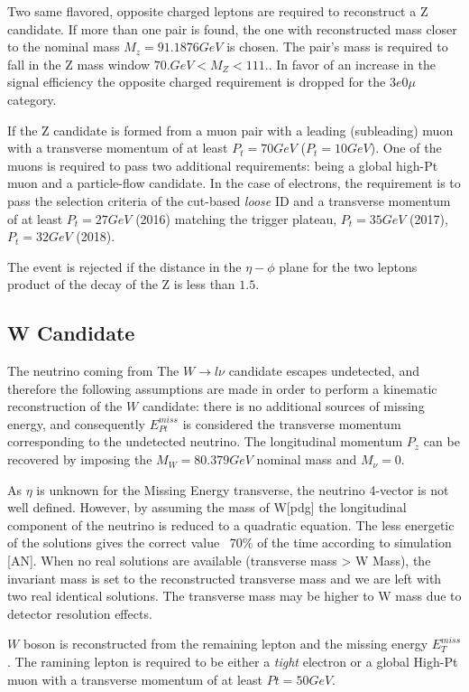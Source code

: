 Two same flavored, opposite charged leptons are required to reconstruct a Z
candidate. If more than one pair is found, the one with reconstructed mass
closer to the nominal mass $M_z= 91.1876 GeV$ is chosen. The pair's mass
is required to fall in the Z mass window $ 70. GeV < M_Z < 111.$. In favor of an
increase in the signal efficiency the opposite charged requirement is dropped
for the $3e0\mu$ category.

If the Z candidate is formed from a muon pair with a leading (subleading) muon with
a transverse momentum of at least $P_t=70 GeV$ ($P_t=10GeV$). One of the
muons is required to pass two additional requirements: being a global high-Pt muon and a
particle-flow candidate. In the case of electrons, the requirement is to pass the
selection criteria of the cut-based \emph{loose} ID and a transverse momentum of
at least $P_t=27GeV$ (2016) matching the trigger plateau, $P_t=35GeV$ (2017),
$P_t=32GeV$ (2018).

The event is rejected if the distance in the $\eta-\phi$ plane for the two
leptons product of the decay of the Z is less than $1.5$.

\subsection{W Candidate}

The neutrino coming from The $W \rightarrow l\nu$ candidate escapes undetected,
and therefore the following assumptions are made in order to perform a kinematic
reconstruction of the $W$ candidate: there is no additional sources of missing
energy, and consequently $E_{Pt}^{miss}$ is considered the transverse momentum
corresponding to the undetected neutrino. The longitudinal momentum $P_z$ can be
recovered by imposing the $M_W = 80.379 GeV $ nominal mass and $M_\nu = 0.$

As $\eta$ is unknown for the Missing Energy transverse, the neutrino 4-vector is
not well defined. However, by assuming the mass of W[pdg] the longitudinal component
of the neutrino is reduced to a quadratic equation. The less energetic of the
solutions gives the correct value ~70\% of the time according to simulation [AN].
When no real solutions are available (transverse mass > W Mass), the invariant
mass is set to the reconstructed transverse mass and we are left with two real
identical solutions. The transverse mass may be higher to W mass due to detector
resolution effects.

$W$ boson is reconstructed from the remaining lepton and the missing energy
$E_T^{miss}$. The ramining lepton is required to be either
a \emph{tight} electron or a global High-Pt muon with a transverse momentum
of at least $Pt=50GeV$.

